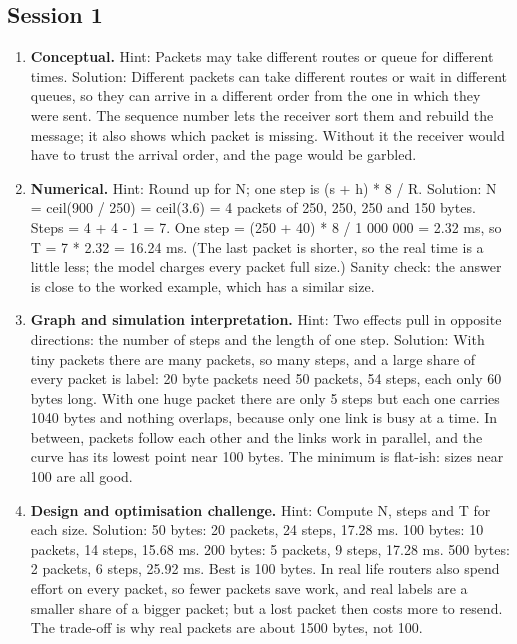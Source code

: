 \documentclass[11pt,a4paper]{article}
\begin{document}
\subsection*{Session 1}
\begin{enumerate}[nosep]
\item \textbf{Conceptual.} Hint: Packets may take different routes or queue for different times. Solution: Different packets can take different routes or wait in different queues, so they can arrive in a different order from the one in which they were sent. The sequence number lets the receiver sort them and rebuild the message; it also shows which packet is missing. Without it the receiver would have to trust the arrival order, and the page would be garbled.
\item \textbf{Numerical.} Hint: Round up for N; one step is (s + h) * 8 / R. Solution: N = ceil(900 / 250) = ceil(3.6) = 4 packets of 250, 250, 250 and 150 bytes. Steps = 4 + 4 - 1 = 7. One step = (250 + 40) * 8 / 1 000 000 = 2.32 ms, so T = 7 * 2.32 = 16.24 ms. (The last packet is shorter, so the real time is a little less; the model charges every packet full size.) Sanity check: the answer is close to the worked example, which has a similar size.
\item \textbf{Graph and simulation interpretation.} Hint: Two effects pull in opposite directions: the number of steps and the length of one step. Solution: With tiny packets there are many packets, so many steps, and a large share of every packet is label: 20 byte packets need 50 packets, 54 steps, each only 60 bytes long. With one huge packet there are only 5 steps but each one carries 1040 bytes and nothing overlaps, because only one link is busy at a time. In between, packets follow each other and the links work in parallel, and the curve has its lowest point near 100 bytes. The minimum is flat-ish: sizes near 100 are all good.
\item \textbf{Design and optimisation challenge.} Hint: Compute N, steps and T for each size. Solution: 50 bytes: 20 packets, 24 steps, 17.28 ms. 100 bytes: 10 packets, 14 steps, 15.68 ms. 200 bytes: 5 packets, 9 steps, 17.28 ms. 500 bytes: 2 packets, 6 steps, 25.92 ms. Best is 100 bytes. In real life routers also spend effort on every packet, so fewer packets save work, and real labels are a smaller share of a bigger packet; but a lost packet then costs more to resend. The trade-off is why real packets are about 1500 bytes, not 100.
\end{enumerate}
\end{document}
